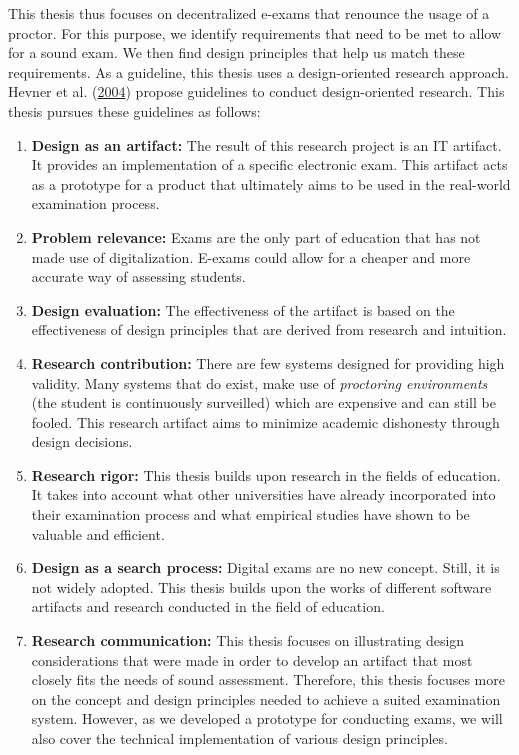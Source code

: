 This thesis thus focuses on decentralized e-exams that renounce the
usage of a proctor. For this purpose, we identify requirements that need
to be met to allow for a sound exam. We then find design principles that
help us match these requirements. As a guideline, this thesis uses a
design-oriented research approach. Hevner et al.
(\protect\hyperlink{ref-Hevner2004}{2004}) propose guidelines to conduct
design-oriented research. This thesis pursues these guidelines as
follows:

\begin{enumerate}
\def\labelenumi{\arabic{enumi}.}
\tightlist
\item
  \textbf{Design as an artifact:} The result of this research project is
  an IT artifact. It provides an implementation of a specific electronic
  exam. This artifact acts as a prototype for a product that ultimately
  aims to be used in the real-world examination process.
\item
  \textbf{Problem relevance:} Exams are the only part of education that
  has not made use of digitalization. E-exams could allow for a cheaper
  and more accurate way of assessing students.
\item
  \textbf{Design evaluation:} The effectiveness of the artifact is based
  on the effectiveness of design principles that are derived from
  research and intuition.
\item
  \textbf{Research contribution:} There are few systems designed for
  providing high validity. Many systems that do exist, make use of
  \emph{proctoring environments} (the student is continuously
  surveilled) which are expensive and can still be fooled. This research
  artifact aims to minimize academic dishonesty through design
  decisions.
\item
  \textbf{Research rigor:} This thesis builds upon research in the
  fields of education. It takes into account what other universities
  have already incorporated into their examination process and what
  empirical studies have shown to be valuable and efficient.
\item
  \textbf{Design as a search process:} Digital exams are no new concept.
  Still, it is not widely adopted. This thesis builds upon the works of
  different software artifacts and research conducted in the field of
  education.
\item
  \textbf{Research communication:} This thesis focuses on illustrating
  design considerations that were made in order to develop an artifact
  that most closely fits the needs of sound assessment. Therefore, this
  thesis focuses more on the concept and design principles needed to
  achieve a suited examination system. However, as we developed a
  prototype for conducting exams, we will also cover the technical
  implementation of various design principles.
\end{enumerate}

